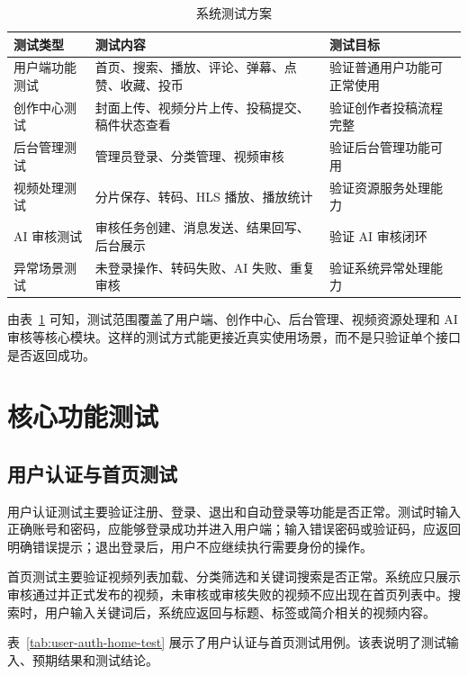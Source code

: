 \begin{table}[htbp]
  \centering
  \caption{系统测试方案}
  \label{tab:test-plan}
  \begin{tabular}{p{}p{}p{}}
    \hline
    \textbf{测试类型} & \textbf{测试内容} & \textbf{测试目标} \\
    \hline
    用户端功能测试 & 首页、搜索、播放、评论、弹幕、点赞、收藏、投币 & 验证普通用户功能可正常使用 \\
    创作中心测试 & 封面上传、视频分片上传、投稿提交、稿件状态查看 & 验证创作者投稿流程完整 \\
    后台管理测试 & 管理员登录、分类管理、视频审核 & 验证后台管理功能可用 \\
    视频处理测试 & 分片保存、转码、HLS 播放、播放统计 & 验证资源服务处理能力 \\
    AI 审核测试 & 审核任务创建、消息发送、结果回写、后台展示 & 验证 AI 审核闭环 \\
    异常场景测试 & 未登录操作、转码失败、AI 失败、重复审核 & 验证系统异常处理能力 \\
    \hline
  \end{tabular}
\end{table}

由表~\ref{tab:test-plan} 可知，测试范围覆盖了用户端、创作中心、后台管理、视频资源处理和 AI 审核等核心模块。这样的测试方式能更接近真实使用场景，而不是只验证单个接口是否返回成功。

\section{核心功能测试}
\label{sec:core-function-test}

\subsection{用户认证与首页测试}
\label{subsec:user-auth-home-test}

用户认证测试主要验证注册、登录、退出和自动登录等功能是否正常。测试时输入正确账号和密码，应能够登录成功并进入用户端；输入错误密码或验证码，应返回明确错误提示；退出登录后，用户不应继续执行需要身份的操作。

首页测试主要验证视频列表加载、分类筛选和关键词搜索是否正常。系统应只展示审核通过并正式发布的视频，未审核或审核失败的视频不应出现在首页列表中。搜索时，用户输入关键词后，系统应返回与标题、标签或简介相关的视频内容。

表~\ref{tab:user-auth-home-test} 展示了用户认证与首页测试用例。该表说明了测试输入、预期结果和测试结论。

